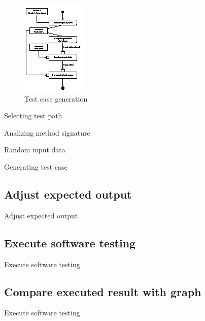 \documentclass{beamer}
\begin{document}
\begin{frame}
    \begin{figure}
        \includegraphics[height=.8\paperheight]{figure/Activities}
        \caption{Test case generation}
        \label{fig:testcasegenearation}
    \end{figure}
\end{frame}

\begin{frame}{Selecting test path}
\end{frame}

\begin{frame}{Analizing method signature}
\end{frame}

\begin{frame}{Random input data}
\end{frame}

\begin{frame}{Generating test case}
\end{frame}

\subsection{Adjust expected output}
\begin{frame}{Adjust expected output}
\end{frame}

\subsection{Execute software testing}
\begin{frame}{Execute software testing}
\end{frame}

\subsection{Compare executed result with graph}
\begin{frame}{Execute software testing}
\end{frame}
\end{document}
